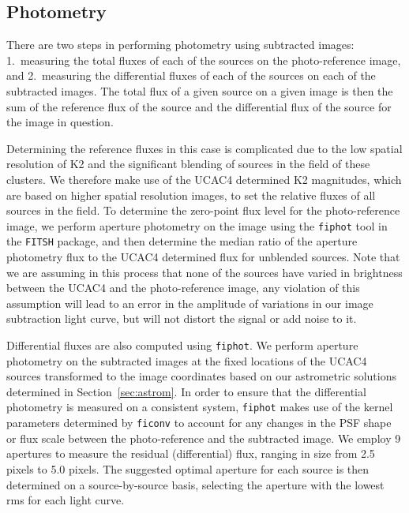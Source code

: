 \documentclass[apjl]{emulateapj}
\begin{document}
\subsection{Photometry}
\label{sec:photometry}

There are two steps in performing photometry using subtracted images:
1.\ measuring the total fluxes of each of the sources on the
photo-reference image, and 2.\ measuring the differential fluxes of each
of the sources on each of the subtracted images. The total flux of a
given source on a given image is then the sum of the reference flux of
the source and the differential flux of the source for the image in
question.

Determining the reference fluxes in this case is complicated due to the
low spatial resolution of K2 and the significant blending of sources in
the field of these clusters. We therefore make use of the UCAC4
determined K2 magnitudes, which are based on higher spatial resolution
images, to set the relative fluxes of all sources in the field. To
determine the zero-point flux level for the photo-reference image, we
perform aperture photometry on the image using the \texttt{fiphot} tool
in the \texttt{FITSH} package, and then determine the median ratio of
the aperture photometry flux to the UCAC4 determined flux for unblended
sources. Note that we are assuming in this process that none of the
sources have varied in brightness between the UCAC4 and the
photo-reference image, any violation of this assumption will lead to an
error in the amplitude of variations in our image subtraction light
curve, but will not distort the signal or add noise to it.

Differential fluxes are also computed using \texttt{fiphot}. We perform
aperture photometry on the subtracted images at the fixed locations of
the UCAC4 sources transformed to the image coordinates based on our
astrometric solutions determined in Section~\ref{sec:astrom}. In order
to ensure that the differential photometry is measured on a consistent
system, \texttt{fiphot} makes use of the kernel parameters determined by
\texttt{ficonv} to account for any changes in the PSF shape or flux
scale between the photo-reference and the subtracted image. We employ 9
apertures to measure the residual (differential) flux, 
ranging in size from 2.5 pixels to
5.0 pixels. The suggested optimal aperture for each source is then
determined on a source-by-source basis, selecting the aperture
with the lowest rms for each light curve.
\end{document}
